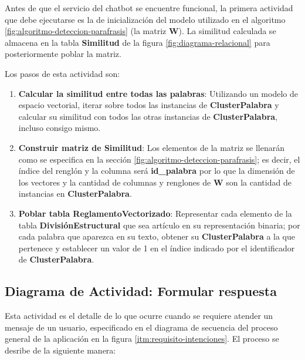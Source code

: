 Antes de que el servicio del chatbot se encuentre funcional, la primera actividad que debe ejecutarse es la de inicialización del modelo utilizado en el algoritmo \ref{fig:algoritmo-deteccion-parafrasis} (la matriz $\mathbf{W}$). La similitud calculada se almacena en la tabla \textbf{Similitud} de la figura \ref{fig:diagrama-relacional} para posteriormente poblar la matriz.

Los pasos de esta actividad son:

\begin{enumerate}
    \item \textbf{Calcular la similitud entre todas las palabras}: Utilizando un modelo de espacio vectorial, iterar sobre todos las instancias de \textbf{ClusterPalabra} y calcular su similitud con todos las otras instancias de \textbf{ClusterPalabra}, incluso consigo mismo.
    \item \textbf{Construir matriz de Similitud}: Los elementos de la matriz se llenarán como se especifica en la sección \ref{fig:algoritmo-deteccion-parafrasis}; es decir, el índice del renglón y la columna será \textbf{id\_palabra} por lo que la dimensión de los vectores y la cantidad de columnas y renglones de $\mathbf{W}$ son la cantidad de instancias en \textbf{ClusterPalabra}.
    \item \textbf{Poblar tabla ReglamentoVectorizado}: Representar cada elemento de la tabla \textbf{DivisiónEstructural} que sea artículo en su representación binaria; por cada palabra que aparezca en su texto, obtener su \textbf{ClusterPalabra} a la que pertenece y establecer un valor de 1 en el índice indicado por el identificador de \textbf{ClusterPalabra}.
\end{enumerate}



\subsection{Diagrama de Actividad: Formular respuesta}
\label{subsec:formular-respuesta}

Esta actividad es el detalle de lo que ocurre cuando se requiere atender un mensaje de un usuario, especificado en el diagrama de secuencia del proceso general de la aplicación en la figura \ref{itm:requisito-intenciones}. El proceso se desribe de la siguiente manera:


